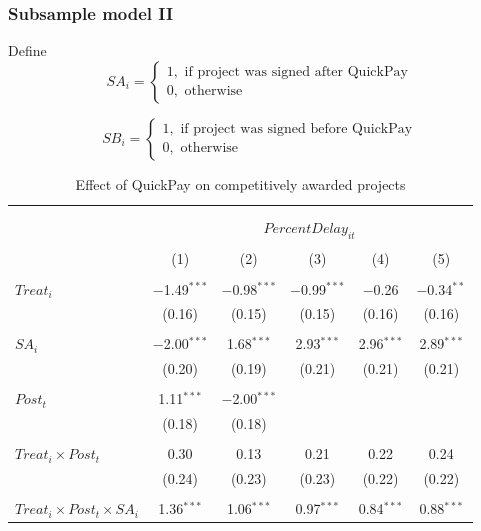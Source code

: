 \documentclass[
]{article}
\begin{document}
\hypertarget{subsample-model-ii}{%
\subsubsection{Subsample model II}\label{subsample-model-ii}}

Define
\[ SA_i = \begin{cases} 1, \text{ if project was signed after QuickPay}\\
0, \text{ otherwise} \end{cases}\]

\[ SB_i = \begin{cases} 1, \text{ if project was signed before QuickPay}\\
0, \text{ otherwise} \end{cases}\]

\begin{table}[H] \centering 
  \caption{Effect of QuickPay on competitively awarded projects} 
  \label{} 
\small 
\begin{tabular}{@{\extracolsep{-2pt}}lccccc} 
\\[-1.8ex]\hline 
\hline \\[-1.8ex] 
\\[-1.8ex] & \multicolumn{5}{c}{$PercentDelay_{it}$  } \\ 
\\[-1.8ex] & (1) & (2) & (3) & (4) & (5)\\ 
\hline \\[-1.8ex] 
 $Treat_i$ & $-$1.49$^{***}$ & $-$0.98$^{***}$ & $-$0.99$^{***}$ & $-$0.26 & $-$0.34$^{**}$ \\ 
  & (0.16) & (0.15) & (0.15) & (0.16) & (0.16) \\ 
  & & & & & \\ 
 $SA_i$ & $-$2.00$^{***}$ & 1.68$^{***}$ & 2.93$^{***}$ & 2.96$^{***}$ & 2.89$^{***}$ \\ 
  & (0.20) & (0.19) & (0.21) & (0.21) & (0.21) \\ 
  & & & & & \\ 
 $Post_t$ & 1.11$^{***}$ & $-$2.00$^{***}$ &  &  &  \\ 
  & (0.18) & (0.18) &  &  &  \\ 
  & & & & & \\ 
 $Treat_i \times Post_t$ & 0.30 & 0.13 & 0.21 & 0.22 & 0.24 \\ 
  & (0.24) & (0.23) & (0.23) & (0.22) & (0.22) \\ 
  & & & & & \\ 
 $Treat_i \times Post_t \times SA_i $ & 1.36$^{***}$ & 1.06$^{***}$ & 0.97$^{***}$ & 0.84$^{***}$ & 0.88$^{***}$ \\ 

\end{tabular}
\end{table}
\end{document}
